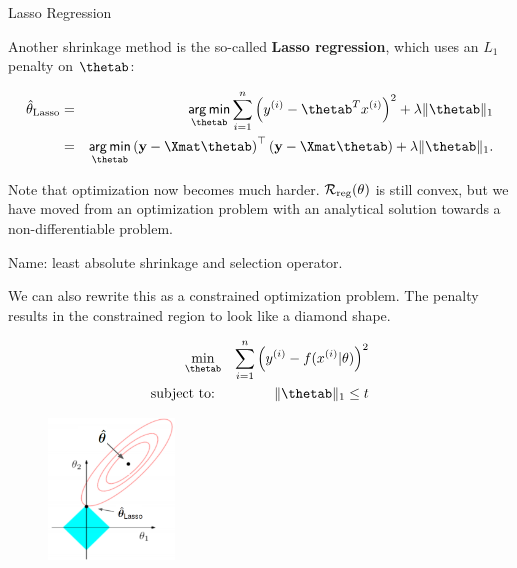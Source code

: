 
\begin{vbframe}{Lasso Regression}

Another shrinkage method is the so-called \textbf{Lasso regression}, which uses an $L_1$ penalty on $\thetab$:

\begin{eqnarray*}
\thetah_{\text{Lasso}} &=&  \argmin_{\thetab} \sumin \left(\yi - \thetab^T \xi\right)^2 + \lambda \|\thetab\|_1 \\
  &=& \argmin_{\thetab} \left(\ydat - \Xmat \thetab\right)^\top \left(\ydat - \Xmat \thetab\right) + \lambda \|\thetab\|_1.
\end{eqnarray*}

Note that optimization now becomes much harder. $\mathcal{R}_{\text{reg}}(\theta)$ is still convex, but we have moved from an optimization problem with an analytical solution towards a non-differentiable problem.

\lz

Name: least absolute shrinkage and selection operator.

\framebreak 

We can also rewrite this as a constrained optimization problem. The penalty results in the constrained region to look like a diamond shape.

\begin{eqnarray*}
\min_{\thetab} && \sumin \left(\yi - \fxit\right)^2\\
\text{subject to: } && \|\thetab\|_1 \leq t \\
\end{eqnarray*}

\vspace*{-1cm}

  \begin{figure}
\includegraphics[width=0.3\textwidth]{figure_man/lasso_hat.png}\\
\end{figure}

\end{vbframe}


\endlecture


